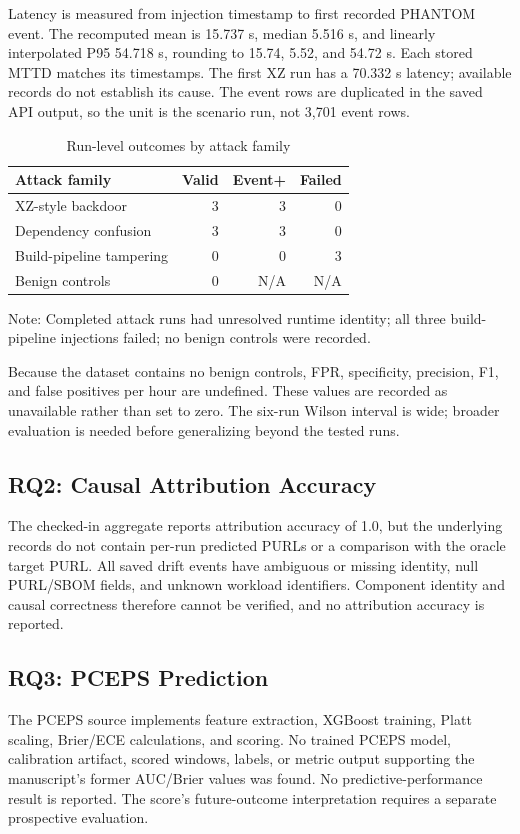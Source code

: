 \documentclass[conference]{IEEEtran}
\begin{document}
Latency is measured from injection timestamp to first recorded PHANTOM event. The recomputed mean is 15.737 s, median 5.516 s, and linearly interpolated P95 54.718 s, rounding to 15.74, 5.52, and 54.72 s. Each stored MTTD matches its timestamps. The first XZ run has a 70.332 s latency; available records do not establish its cause. The event rows are duplicated in the saved API output, so the unit is the scenario run, not 3,701 event rows.

\begin{table}[!t]\caption{Run-level outcomes by attack family}\label{tab:scenario-cm}\centering\scriptsize
\begin{tabularx}{\columnwidth}{>{\raggedright\arraybackslash}Xrrr}\toprule
Attack family & Valid & Event+ & Failed\\\midrule
XZ-style backdoor & 3 & 3 & 0\\
Dependency confusion & 3 & 3 & 0\\
Build-pipeline tampering & 0 & 0 & 3\\
Benign controls & 0 & N/A & N/A\\\bottomrule
\end{tabularx}
\par\vspace{1pt}\footnotesize Note: Completed attack runs had unresolved runtime identity; all three build-pipeline injections failed; no benign controls were recorded.
\end{table}

Because the dataset contains no benign controls, FPR, specificity, precision, F1, and false positives per hour are undefined. These values are recorded as unavailable rather than set to zero. The six-run Wilson interval is wide; broader evaluation is needed before generalizing beyond the tested runs.

\subsection{RQ2: Causal Attribution Accuracy}
The checked-in aggregate reports attribution accuracy of 1.0, but the underlying records do not contain per-run predicted PURLs or a comparison with the oracle target PURL. All saved drift events have ambiguous or missing identity, null PURL/SBOM fields, and unknown workload identifiers. Component identity and causal correctness therefore cannot be verified, and no attribution accuracy is reported.

\subsection{RQ3: PCEPS Prediction}
The PCEPS source implements feature extraction, XGBoost training, Platt scaling, Brier/ECE calculations, and scoring. No trained PCEPS model, calibration artifact, scored windows, labels, or metric output supporting the manuscript's former AUC/Brier values was found. No predictive-performance result is reported. The score's future-outcome interpretation requires a separate prospective evaluation.
\end{document}
